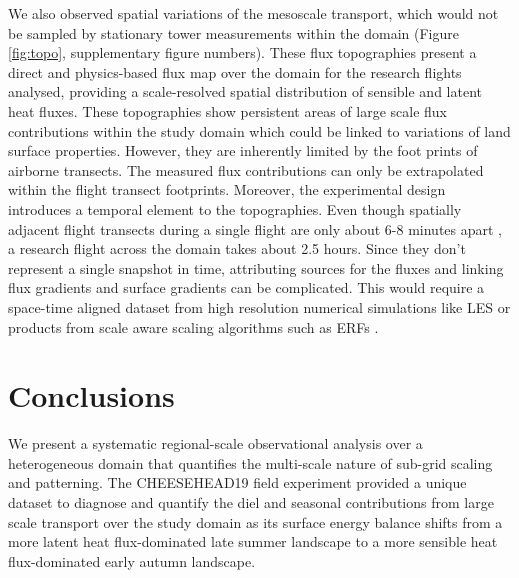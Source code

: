 \documentclass[draft]{agujournal2019}
\begin{document}
We also observed spatial variations of the mesoscale transport, which would not be sampled by stationary tower measurements within the domain (Figure \ref{fig:topo}, supplementary figure numbers). These flux topographies present a direct and physics-based flux map over the domain for the research flights analysed, providing a scale-resolved spatial distribution of sensible and latent heat fluxes. These topographies show persistent areas of large scale flux contributions within the study domain which could be linked to variations of land surface properties. However, they are inherently limited by the foot prints of airborne transects. The measured flux contributions can only be extrapolated within the flight transect footprints. Moreover, the experimental design introduces a temporal element to the topographies. Even though spatially adjacent flight transects during a single flight are only about 6-8 minutes apart , a research flight across the domain takes about 2.5 hours. Since they don't represent a single snapshot in time, attributing sources for the fluxes  and linking flux gradients and surface gradients can be complicated. This would require a space-time aligned dataset from high resolution numerical simulations like LES or products from scale aware scaling algorithms such as ERFs \cite{metzger_spatially_2013}.

\section{Conclusions}

We present a systematic regional-scale observational analysis over a heterogeneous domain that quantifies the multi-scale nature of sub-grid scaling and patterning. The CHEESEHEAD19 field experiment provided a unique dataset to diagnose and quantify the diel and seasonal contributions from large scale transport over the study domain as its surface energy balance  shifts from a more latent heat flux-dominated late summer landscape to a more sensible heat flux-dominated early autumn landscape.
\end{document}
